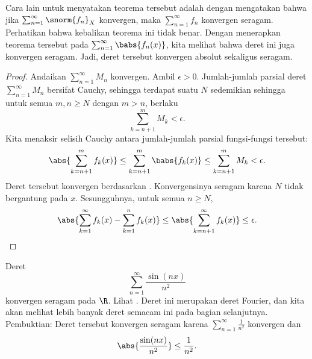 Cara lain untuk menyatakan teorema tersebut adalah dengan mengatakan bahwa jika
$\sum_{n=1}^\infty \snorm{f_n}_X$ konvergen, maka $\sum_{n=1}^\infty f_n$ konvergen seragam.
Perhatikan bahwa kebalikan teorema ini tidak benar.
Dengan menerapkan teorema tersebut pada $\sum_{n=1}^\infty \babs{f_n(x)}$, kita
melihat bahwa deret ini juga konvergen seragam. Jadi, deret tersebut konvergen absolut
sekaligus seragam.

\begin{proof}
Andaikan $\sum_{n=1}^\infty M_n$ konvergen. Ambil $\epsilon > 0$.
Jumlah-jumlah parsial deret $\sum_{n=1}^\infty M_n$ bersifat Cauchy, sehingga
terdapat suatu $N$ sedemikian sehingga untuk semua $m, n \geq N$ dengan $m > n$, berlaku
\begin{equation*}
\sum_{k=n+1}^m M_k < \epsilon .
\end{equation*}
Kita menaksir selisih Cauchy antara jumlah-jumlah parsial
fungsi-fungsi tersebut:
\begin{equation*}
\abs{\sum_{k=n+1}^m f_k(x)} \leq
\sum_{k=n+1}^m \babs{f_k(x)} \leq
\sum_{k=n+1}^m M_k < \epsilon .
\end{equation*}
Deret tersebut konvergen berdasarkan .
Konvergensinya seragam karena $N$ tidak bergantung pada $x$.
Sesungguhnya, untuk semua $n \geq N$,
\begin{equation*}
\abs{\sum_{k=1}^\infty f_k(x) - \sum_{k=1}^n f_k(x)} \leq
\abs{\sum_{k=n+1}^\infty f_k(x)} \leq \epsilon .
\qedhere
\end{equation*}
\end{proof}

\begin{example} \label{example:sinnsqfourier}
Deret
\begin{equation*}
\sum_{n=1}^\infty \frac{\sin(nx)}{n^2}
\end{equation*}
konvergen seragam pada $\R$. Lihat .
Deret ini merupakan deret Fourier, dan
kita akan melihat lebih banyak deret semacam ini pada bagian selanjutnya. Pembuktian:
Deret tersebut konvergen seragam karena
$\sum_{n=1}^\infty \frac{1}{n^2}$
konvergen dan
\begin{equation*}
\abs{\frac{\sin(nx)}{n^2}} \leq 
\frac{1}{n^2} .
\end{equation*}
\end{example}

\begin{myfigureht}
\caption{Grafik
$\sum_{n=1}^\infty \frac{\sin(n x)}{n^2}$ yang mencakup
8 jumlah parsial pertamanya dalam berbagai nuansa abu-abu.\label{fig:fouriersern2}}
\end{myfigureht}

